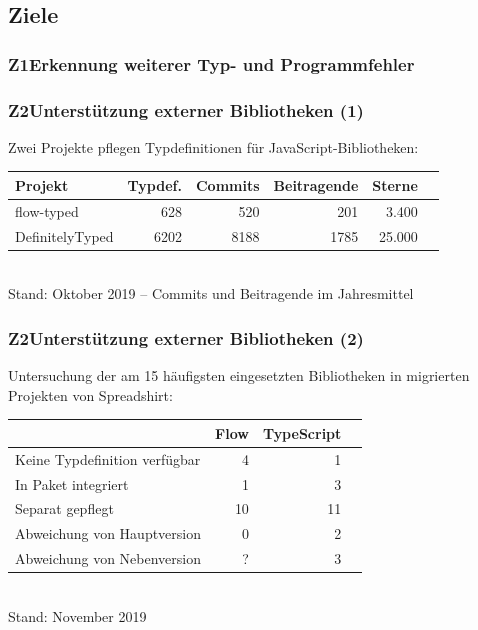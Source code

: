     \subsection{Ziele}

      \begin{frame}
        \frametitle{Z1\hspace{0.75em}Erkennung weiterer Typ- und Programmfehler}
      \end{frame}

      \begin{frame}
        \frametitle{Z2\hspace{0.75em}Unterstützung externer Bibliotheken (1)}
        Zwei Projekte pflegen Typdefinitionen für JavaScript-Bibliotheken:\\[1.5em]
        {
          \footnotesize
          \begin{tabu} to 
            \midrule
            \rowfont{\bfseries} Projekt & Typdef. & Commits & Beitragende & Sterne & {} \\
            \midrule
            flow-typed      &  628 &  520 &  201 &  3.400 & \autocite{FLOW_TYPED} \\
            DefinitelyTyped & 6202 & 8188 & 1785 & 25.000 & \autocite{DEFINITELY_TYPED} \\
            \midrule
          \end{tabu}
          \\[1em]
          Stand: Oktober 2019 -- Commits und Beitragende im Jahresmittel
        }
      \end{frame}

      \begin{frame}
        \frametitle{Z2\hspace{0.75em}Unterstützung externer Bibliotheken (2)}
        Untersuchung der am 15 häufigsten eingesetzten Bibliotheken in migrierten Projekten von Spreadshirt:\\[1.5em]

        {
          \footnotesize
          \begin{tabu} to 
            \midrule
            \rowfont{\bfseries}  {} & Flow & TypeScript \\
            \midrule
            Keine Typdefinition verfügbar &  4 &  1 \\
            In Paket integriert           &  1 &  3 \\
            Separat gepflegt              & 10 & 11 \\
            \midrule
            Abweichung von Hauptversion   &  0 &  2 \\
            Abweichung von Nebenversion   &  ? &  3 \\
            \midrule
          \end{tabu}
          \\[1em]
          Stand: November 2019
        }

      \end{frame}

